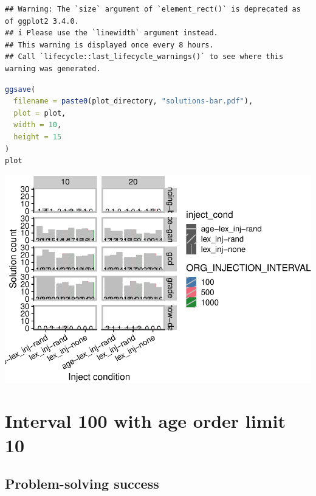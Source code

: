 \documentclass[
]{book}
\begin{document}
\begin{lstlisting}
## Warning: The `size` argument of `element_rect()` is deprecated as of ggplot2 3.4.0.
## i Please use the `linewidth` argument instead.
## This warning is displayed once every 8 hours.
## Call `lifecycle::last_lifecycle_warnings()` to see where this warning was generated.
\end{lstlisting}

\begin{lstlisting}[language=R]
ggsave(
  filename = paste0(plot_directory, "solutions-bar.pdf"),
  plot = plot,
  width = 10,
  height = 15
)
plot
\end{lstlisting}

\includegraphics{age-based-lex-supplemental_files/figure-latex/unnamed-chunk-7-1.pdf}

\hypertarget{interval-100-with-age-order-limit-10}{%
\section{Interval 100 with age order limit 10}\label{interval-100-with-age-order-limit-10}}

\hypertarget{problem-solving-success}{%
\subsection{Problem-solving success}\label{problem-solving-success}}
\end{document}
